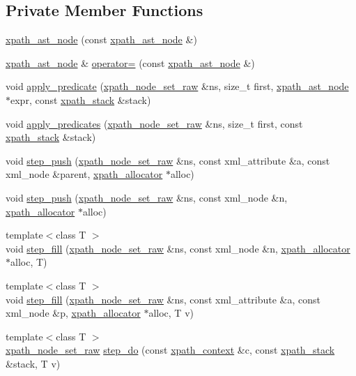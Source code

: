 \subsection*{Private Member Functions}
\begin{DoxyCompactItemize}
\item 
\hyperlink{classxpath__ast__node_ae5a059e41b41505bef1f7dbebda8070b}{xpath\-\_\-ast\-\_\-node} (const \hyperlink{classxpath__ast__node}{xpath\-\_\-ast\-\_\-node} \&)
\item 
\hyperlink{classxpath__ast__node}{xpath\-\_\-ast\-\_\-node} \& \hyperlink{classxpath__ast__node_a60fddea92b095c2b8705f12f7309e6aa}{operator=} (const \hyperlink{classxpath__ast__node}{xpath\-\_\-ast\-\_\-node} \&)
\item 
void \hyperlink{classxpath__ast__node_afcefe6b386c214349c5e23f13828fa1e}{apply\-\_\-predicate} (\hyperlink{classxpath__node__set__raw}{xpath\-\_\-node\-\_\-set\-\_\-raw} \&ns, size\-\_\-t first, \hyperlink{classxpath__ast__node}{xpath\-\_\-ast\-\_\-node} $\ast$expr, const \hyperlink{structxpath__stack}{xpath\-\_\-stack} \&stack)
\item 
void \hyperlink{classxpath__ast__node_ae5e3b5fec836d9478ebd195dda7fdedd}{apply\-\_\-predicates} (\hyperlink{classxpath__node__set__raw}{xpath\-\_\-node\-\_\-set\-\_\-raw} \&ns, size\-\_\-t first, const \hyperlink{structxpath__stack}{xpath\-\_\-stack} \&stack)
\item 
void \hyperlink{classxpath__ast__node_aa141bfbd4d5e42da83f0de8f729eb849}{step\-\_\-push} (\hyperlink{classxpath__node__set__raw}{xpath\-\_\-node\-\_\-set\-\_\-raw} \&ns, const xml\-\_\-attribute \&a, const xml\-\_\-node \&parent, \hyperlink{classxpath__allocator}{xpath\-\_\-allocator} $\ast$alloc)
\item 
void \hyperlink{classxpath__ast__node_a7083f1a6c3d4128bb8a4ac147851a86b}{step\-\_\-push} (\hyperlink{classxpath__node__set__raw}{xpath\-\_\-node\-\_\-set\-\_\-raw} \&ns, const xml\-\_\-node \&n, \hyperlink{classxpath__allocator}{xpath\-\_\-allocator} $\ast$alloc)
\item 
{\footnotesize template$<$class T $>$ }\\void \hyperlink{classxpath__ast__node_a725919925f8489f279173c1b653ba092}{step\-\_\-fill} (\hyperlink{classxpath__node__set__raw}{xpath\-\_\-node\-\_\-set\-\_\-raw} \&ns, const xml\-\_\-node \&n, \hyperlink{classxpath__allocator}{xpath\-\_\-allocator} $\ast$alloc, T)
\item 
{\footnotesize template$<$class T $>$ }\\void \hyperlink{classxpath__ast__node_aa65fdd16b494e000821cc2d22de7e2c1}{step\-\_\-fill} (\hyperlink{classxpath__node__set__raw}{xpath\-\_\-node\-\_\-set\-\_\-raw} \&ns, const xml\-\_\-attribute \&a, const xml\-\_\-node \&p, \hyperlink{classxpath__allocator}{xpath\-\_\-allocator} $\ast$alloc, T v)
\item 
{\footnotesize template$<$class T $>$ }\\\hyperlink{classxpath__node__set__raw}{xpath\-\_\-node\-\_\-set\-\_\-raw} \hyperlink{classxpath__ast__node_a80577a0dc3e6369c79958eb9beb2edbc}{step\-\_\-do} (const \hyperlink{structxpath__context}{xpath\-\_\-context} \&c, const \hyperlink{structxpath__stack}{xpath\-\_\-stack} \&stack, T v)
\end{DoxyCompactItemize}
